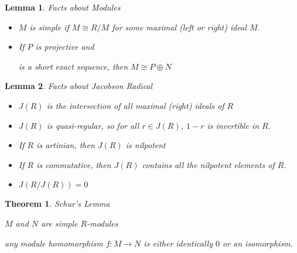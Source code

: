\documentclass[12pt]{Qual}
\newtheorem{theorem}{Theorem}
\newtheorem{lemma}{Lemma}
\begin{document}
\begin{lemma}{\Large\textit{Facts about Modules}}

\begin{itemize}
\renewcommand\labelitemi{\faCoffee}
    \item $M$ is simple if $M\cong R/M$ for some maximal (left or right) ideal $M$.
    \item If $P$ is projective and  is a short exact sequence, then $M\cong P\oplus N$
\end{itemize}

\end{lemma}
\vspace{0.5cm}
\begin{lemma}{\Large\textit{Facts about Jacobson Radical}}

\begin{itemize}
\renewcommand\labelitemi{\faCoffee}
    \item $J(R)$ is the intersection of all maximal (right) ideals of $R$
    \item $J(R)$ is quasi-regular, so for all $r\in J(R)$, $1-r$ is invertible in $R$.
    \item If $R$ is artinian, then $J(R)$ is nilpotent
    \item If $R$ is commutative, then $J(R)$ contains all the nilpotent elements of $R$.
    \item $J(R/J(R))=0$
\end{itemize}

\end{lemma}
\vspace{0.5cm}
\begin{theorem}{\Large\textit{Schur's Lemma}}

 $M$ and $N$ are simple $R$-modules

 \begin{minipage}{0.85\textwidth}
\vspace{0.45cm}
any module homomorphism $f:M\to N$ is either identically $0$ or an isomorphism.
\end{minipage}

\end{theorem}
\vspace{0.5cm}
\end{document}
